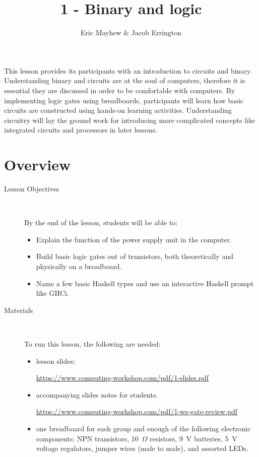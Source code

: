 \documentclass[11pt]{article}
\title{1 - Binary and logic}
\author{Eric Mayhew \& Jacob Errington}
\date{}
\newcommand{\cwurl}{https://www.computing-workshop.com/}
\newcommand{\cwpdf}{\cwurl pdf/}
\begin{document}
\maketitle
This lesson provides its participants with an introduction to circuits and
binary. Understanding binary and circuits are at the soul of computers,
therefore it is essential they are discussed in order to be comfortable with
computers. By implementing logic gates using breadboards, participants will learn how basic circuits are
constructed using hands-on learning activities. Understanding circuitry will lay the ground work for
introducing more complicated concepts like integrated circuits and processors in later lessons.

\section*{Overview}

\begin{description}
  \item[Lesson Objectives] ~

   By the end of the lesson, students will be able to:

  \begin{itemize}
    \item Explain the function of the power supply unit in the computer.

    \item Build basic logic gates out of transistors, both theoretically and
      physically on a breadboard.

    \item Name a few basic Haskell types and use an interactive Haskell prompt
      like GHCi.
  \end{itemize}

  \item [Materials]~

    To run this lesson, the following are needed:

    \begin{itemize}
      \item
        lesson slides;

        \url{\cwpdf 1-slides.pdf}

      \item
        accompanying slides notes for students.

        \url{\cwpdf 1-ws-gate-review.pdf}

      \item
        one breadboard for each group and enough of the following electronic
        components:
        NPN transistors,
        10~$\Omega$ resistors,
        9~V batteries,
        5~V voltage regulators,
        jumper wires (male to male),
        and assorted LEDs.

    \end{itemize}
\end{description}
\end{document}
